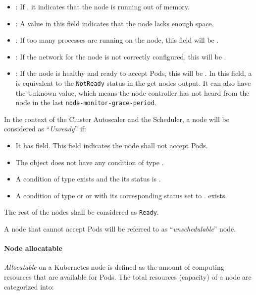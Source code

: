 \begin{itemize}
	\tightlist
	\item {}: If , it indicates that the node is
	      running out of memory.
	\item {}: A  value in this field indicates that the
	      node lacks enough space.
	\item {}: If too many processes are running on the node, this
	      field will be .
	\item {}: If the network for the node is not correctly
	      configured, this will be .
	\item {}: If the node is healthy and ready to accept Pods, this will
	      be . In this field, a  is equivalent to the
	      \texttt{NotReady} status in the get nodes output. It can also have the
	      Unknown value, which means the node controller has not heard from the
	      node in the last \texttt{node-monitor-grace-period}.
\end{itemize}

In the context of the Cluster Autoscaler and the Scheduler, a node will be
considered as ``\textit{Unready}''  if:
\begin{itemize}
	\tightlist
	\item It has  field. This field indicates the
	      node shall not accept Pods.
	\item The  object does not have any condition of type .
	\item A condition of type  exists and the its status is
	      .
	\item A condition of type  or  or
	       with its corresponding status set to
	      . exists.
\end{itemize}

The rest of the nodes shall be considered as \texttt{Ready}.

A node that cannot accept Pods will be referred to as ``\textit{unschedulable}''
node.

\paragraph*{Node allocatable}
\label{section:node-allocatable}

\textit{Allocatable} on a Kubernetes node is defined as the amount of computing
resources that are available for Pods.  The total resources (capacity) of a node
are categorized into:


